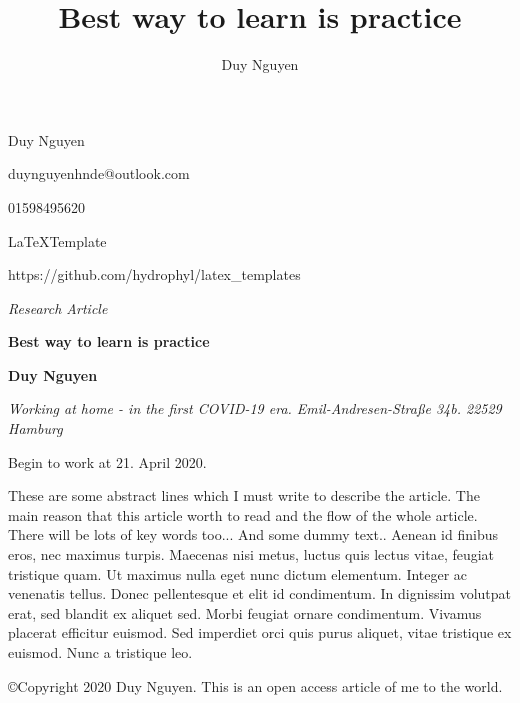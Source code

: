 \documentclass[draft=false
              ,paper=a4
              ,twoside=false
              ,fontsize=10pt
              ,headsepline
              ,BCOR10mm
              ,DIV11
              ]{article}
\title{Best way to learn is practice}
\author{Duy Nguyen}
\begin{document}
\color{smokyblack}

\setlength{\parskip}{1ex}

\small{Duy Nguyen}

\small{duynguyenhnde@outlook.com}

\small{01598495620}

\small{\LaTeX Template}

\small{https://github.com/hydrophyl/latex\_templates}

\vspace{2cm}

\textsf{\textit{\Large{Research Article}}}

\color{arsenic}
\textsf{\textbf{\huge{Best way to learn is practice}}}

\setlength{\parskip}{0.8em}
\color{smokyblack}
\begin{adjustwidth}{3em}{0pt}
\begin{flushleft}
	\textbf{Duy Nguyen}


	\textit{Working at home - in the first COVID-19 era. Emil-Andresen-Stra\ss e 34b. 22529 Hamburg}
		

	Begin to work at 21. April 2020.


	These are some abstract lines which I must write to describe the article. The main reason that this article worth to read and the flow of the whole article. There will be lots of key words too... And some dummy text.. Aenean id finibus eros, nec maximus turpis. Maecenas nisi metus, luctus quis lectus vitae, feugiat tristique quam. Ut maximus nulla eget nunc dictum elementum. Integer ac venenatis tellus. Donec pellentesque et elit id condimentum. In dignissim volutpat erat, sed blandit ex aliquet sed. Morbi feugiat ornare condimentum. Vivamus placerat efficitur euismod. Sed imperdiet orci quis purus aliquet, vitae tristique ex euismod. Nunc a tristique leo.


	\copyright Copyright 2020 Duy Nguyen. This is an open access article of me to the world.
\end{flushleft}
\end{adjustwidth}

{}
{}
{}

\end{document}
